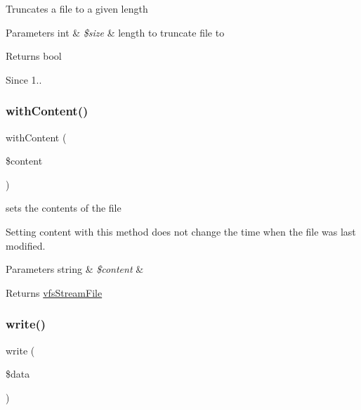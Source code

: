 Truncates a file to a given length


\begin{DoxyParams}[1]{Parameters}
int & {\em \$size} & length to truncate file to \\
\hline
\end{DoxyParams}
\begin{DoxyReturn}{Returns}
bool 
\end{DoxyReturn}
\begin{DoxySince}{Since}
1.. 
\end{DoxySince}
\mbox{\label{classorg_1_1bovigo_1_1vfs_1_1vfs_stream_file_a02f4f68a56cc7695c22739e95a8b785c}} 
\subsubsection{\texorpdfstring{with\+Content()}{withContent()}}
{\footnotesize\ttfamily with\+Content (\begin{DoxyParamCaption}\item[{}]{\$content }\end{DoxyParamCaption})}

sets the contents of the file

Setting content with this method does not change the time when the file was last modified.


\begin{DoxyParams}[1]{Parameters}
string & {\em \$content} & \\
\hline
\end{DoxyParams}
\begin{DoxyReturn}{Returns}
\mbox{\hyperlink{classorg_1_1bovigo_1_1vfs_1_1vfs_stream_file}{vfs\+Stream\+File}} 
\end{DoxyReturn}
\mbox{\label{classorg_1_1bovigo_1_1vfs_1_1vfs_stream_file_a85013b0dcf138f6997e2a05332ed0dd5}} 
\subsubsection{\texorpdfstring{write()}{write()}}
{\footnotesize\ttfamily write (\begin{DoxyParamCaption}\item[{}]{\$data }\end{DoxyParamCaption})}

